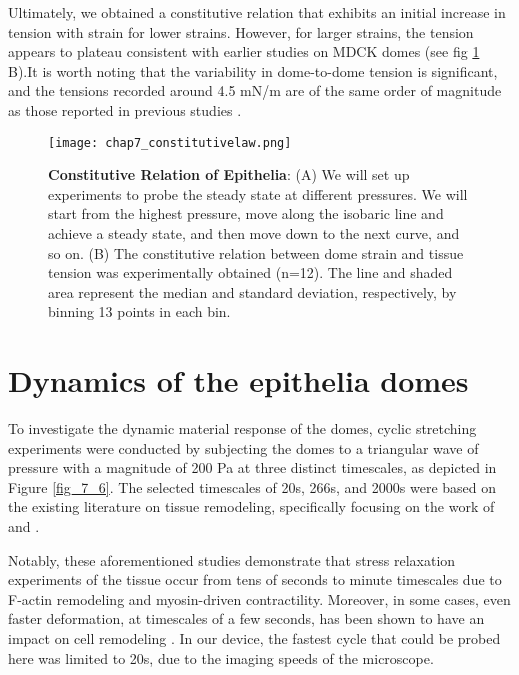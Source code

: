 Ultimately, we obtained a constitutive relation that exhibits an initial increase in tension with strain for lower strains. However, for larger strains, the tension appears to plateau consistent with earlier studies on MDCK domes (see fig \ref{fig_7_5} B).It is worth noting that the variability in dome-to-dome tension is significant, and the tensions recorded around 4.5 \unit{mN/m} are of the same order of magnitude as those reported in previous studies \cite{latorre2018, marin-llaurado2022}.

\begin{figure}
	\centering
	\texttt{[image: chap7\_constitutivelaw.png]}
	\caption{\label{fig_7_5} \textbf{Constitutive Relation of Epithelia}: (A) We will set up experiments to probe the steady state at different pressures. We will start from the highest pressure, move along the isobaric line and achieve a steady state, and then move down to the next curve, and so on.	(B) The constitutive relation between dome strain and tissue tension was experimentally obtained (n=12). The line and shaded area represent the median and standard deviation, respectively, by binning 13 points in each bin.
	}
\end{figure}


\hypertarget{dynamics-of-the-epithelia-domes}{%
	\section{Dynamics of the epithelia
		domes}\label{dynamics-of-the-epithelia-domes}}
	

To investigate the dynamic material response of the domes, cyclic stretching experiments were conducted by subjecting the domes to a triangular wave of pressure with a magnitude of 200 Pa at three distinct timescales, as depicted in Figure \ref{fig_7_6}. The selected timescales of 20s, 266s, and 2000s were based on the existing literature on tissue remodeling, specifically focusing on the work of \cite{khalilgharibi2019} and \cite{casares2015}.

Notably, these aforementioned studies demonstrate that stress relaxation experiments of the tissue occur from tens of seconds to minute timescales due to F-actin remodeling and myosin-driven contractility. Moreover, in some cases, even faster deformation, at timescales of a few seconds, has been shown to have an impact on cell remodeling \cite{andreu2021a}.  In our device, the fastest cycle that could be probed here was limited to 20s, due to the imaging speeds of the microscope.

